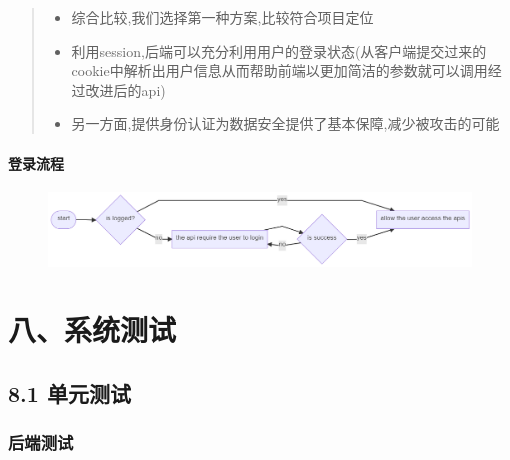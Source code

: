 \documentclass[
]{article}
\begin{document}
\begin{quote}
\begin{itemize}
\item
  综合比较,我们选择第一种方案,比较符合项目定位
\item
  利用session,后端可以充分利用用户的登录状态(从客户端提交过来的cookie中解析出用户信息从而帮助前端以更加简洁的参数就可以调用经过改进后的api)
\item
  另一方面,提供身份认证为数据安全提供了基本保障,减少被攻击的可能
\end{itemize}
\end{quote}

\hypertarget{ux767bux5f55ux6d41ux7a0b}{%
\paragraph{登录流程}\label{ux767bux5f55ux6d41ux7a0b}}

\begin{figure}
\centering
\includegraphics[width=10.03125in,height=\textheight]{16548498538521.png}
\caption{}
\end{figure}

\hypertarget{ux516bux7cfbux7edfux6d4bux8bd5}{%
\section{八、系统测试}\label{ux516bux7cfbux7edfux6d4bux8bd5}}

\hypertarget{81-ux5355ux5143ux6d4bux8bd5}{%
\subsection{8.1 单元测试}\label{81-ux5355ux5143ux6d4bux8bd5}}

\begin{quote}
\end{quote}

\hypertarget{ux540eux7aefux6d4bux8bd5}{%
\subsubsection{后端测试}\label{ux540eux7aefux6d4bux8bd5}}
\end{document}

